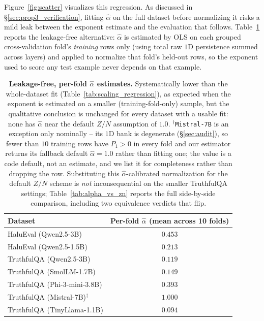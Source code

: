 \documentclass{article}
\begin{document}
Figure~\ref{fig:scatter} visualizes this regression. As discussed in \S\ref{sec:prop3_verification}, fitting $\hat\alpha$ on the full dataset before normalizing it risks a mild leak between the exponent estimate and the evaluation that follows. Table~\ref{tab:scaling_alpha_calibrated} reports the leakage-free alternative: $\hat\alpha$ is estimated by OLS on each grouped cross-validation fold's \emph{training} rows only (using total raw $1$D persistence summed across layers) and applied to normalize that fold's held-out rows, so the exponent used to score any test example never depends on that example.

\begin{table}[ht]
\centering
\small
\begin{tabular}{lc}
\toprule
\textbf{Dataset} & \textbf{Per-fold $\hat{\alpha}$ (mean across 10 folds)} \\
\midrule
HaluEval (Qwen2.5-3B) & $0.453$ \\
HaluEval (Qwen2.5-1.5B) & $0.213$ \\
TruthfulQA (Qwen2.5-3B) & $0.119$ \\
TruthfulQA (SmolLM-1.7B) & $0.149$ \\
TruthfulQA (Phi-3-mini-3.8B) & $0.393$ \\
TruthfulQA (Mistral-7B)$^\dagger$ & $1.000$ \\
TruthfulQA (TinyLlama-1.1B) & $0.094$ \\
\bottomrule
\end{tabular}
\caption{\textbf{Leakage-free, per-fold $\hat\alpha$ estimates.} Systematically lower than the whole-dataset fit (Table~\ref{tab:scaling_regression}), as expected when the exponent is estimated on a smaller (training-fold-only) sample, but the qualitative conclusion is unchanged for every dataset with a usable fit: none has $\hat\alpha$ near the default $Z/N$ assumption of $1.0$. $^\dagger$\texttt{Mistral-7B} is an exception only nominally -- its $1$D bank is degenerate (\S\ref{sec:audit}), so fewer than $10$ training rows have $P_1>0$ in every fold and our estimator returns its fallback default $\hat\alpha{=}1.0$ rather than fitting one; the value is a code default, not an estimate, and we list it for completeness rather than dropping the row. Substituting this $\hat\alpha$-calibrated normalization for the default $Z/N$ scheme is \emph{not} inconsequential on the smaller TruthfulQA settings; Table~\ref{tab:alpha_vs_zn} reports the full side-by-side comparison, including two equivalence verdicts that flip.}
\label{tab:scaling_alpha_calibrated}
\end{table}
\end{document}
